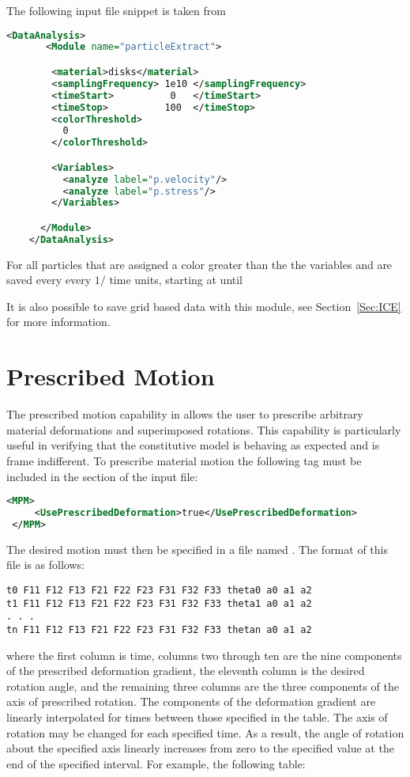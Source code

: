 The following input file snippet is taken from
\begin{lstlisting}[language=XML]
    <DataAnalysis>
       <Module name="particleExtract">

        <material>disks</material>
        <samplingFrequency> 1e10 </samplingFrequency>
        <timeStart>          0   </timeStart>
        <timeStop>          100  </timeStop>
        <colorThreshold>
          0
        </colorThreshold>

        <Variables>
          <analyze label="p.velocity"/>
          <analyze label="p.stress"/>
        </Variables>

      </Module>
    </DataAnalysis>
\end{lstlisting}

For all particles that are assigned a color greater than the
 the variables
 and
 are saved every every
$1/$ time units, starting at
 until

It is also possible to save grid based data with this module,
see Section~\ref{Sec:ICE} for more information.

\section{Prescribed Motion} \label{Sec:PrescribedMotion} The prescribed motion
capability in \Vaango allows the user to prescribe arbitrary material
deformations and superimposed rotations.  This capability is particularly
useful in verifying that the constitutive model is behaving as expected and is
frame indifferent.  To prescribe material motion the following tag must be
included in the  section of the input file:

\begin{lstlisting}[language=XML]
 <MPM>
     <UsePrescribedDeformation>true</UsePrescribedDeformation>
 </MPM>
\end{lstlisting}

The desired motion must then be specified in a file named .  The format of this file is as follows:

\begin{lstlisting}[backgroundcolor=\color{background}]
t0 F11 F12 F13 F21 F22 F23 F31 F32 F33 theta0 a0 a1 a2
t1 F11 F12 F13 F21 F22 F23 F31 F32 F33 theta1 a0 a1 a2
. . .
tn F11 F12 F13 F21 F22 F23 F31 F32 F33 thetan a0 a1 a2

\end{lstlisting}
where the first column is time, columns two through ten are the nine components of the prescribed deformation gradient, the eleventh column is the desired rotation angle, and the remaining three columns are the three components of the axis of prescribed rotation.  The components of the deformation gradient are linearly interpolated for times between those specified in the table.  The axis of rotation may be changed for each specified time.  As a result, the angle of rotation about the specified axis linearly increases from zero to the specified value at the end of the specified interval.  For example, the following table:

